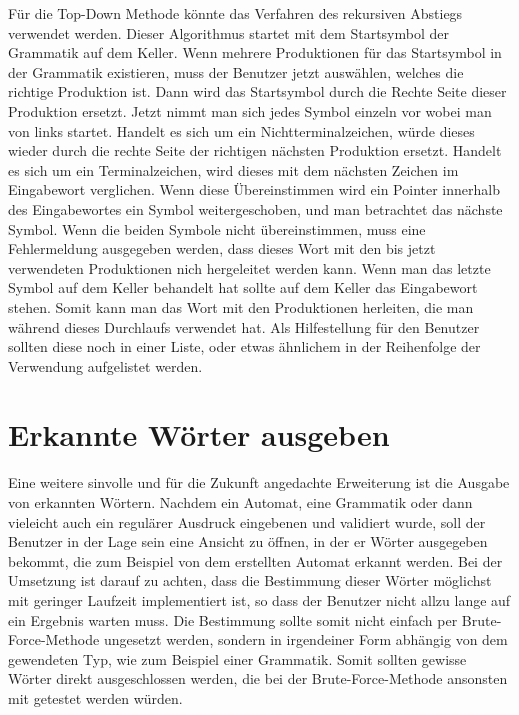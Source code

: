 Für die Top-Down Methode könnte das Verfahren des rekursiven Abstiegs verwendet
werden. Dieser Algorithmus startet mit dem Startsymbol der Grammatik auf dem
Keller. Wenn mehrere Produktionen für das Startsymbol in der Grammatik
existieren, muss der Benutzer jetzt auswählen, welches die richtige Produktion ist. Dann wird
das Startsymbol durch die Rechte Seite dieser Produktion ersetzt. Jetzt nimmt
man sich jedes Symbol einzeln vor wobei man von links startet. Handelt es sich
um ein Nichtterminalzeichen, würde dieses wieder durch die rechte Seite der
richtigen nächsten Produktion ersetzt. Handelt es sich um ein Terminalzeichen,
wird dieses mit dem nächsten Zeichen im Eingabewort verglichen. Wenn diese
Übereinstimmen wird ein Pointer innerhalb des Eingabewortes ein Symbol
weitergeschoben, und man betrachtet das nächste Symbol. Wenn die beiden Symbole
nicht übereinstimmen, muss eine Fehlermeldung ausgegeben werden, dass dieses
Wort mit den bis jetzt verwendeten Produktionen nich hergeleitet werden kann.
Wenn man das letzte Symbol auf dem Keller behandelt hat sollte auf dem Keller
das Eingabewort stehen. Somit kann man das Wort mit den Produktionen herleiten,
die man während dieses Durchlaufs verwendet hat. Als Hilfestellung für den
Benutzer sollten diese noch in einer Liste, oder etwas ähnlichem in der
Reihenfolge der Verwendung aufgelistet werden.\vspace{10pt}

\section{Erkannte Wörter ausgeben}

Eine weitere sinvolle und für die Zukunft angedachte Erweiterung ist die
Ausgabe von erkannten Wörtern. Nachdem ein Automat, eine Grammatik oder dann
vieleicht auch ein regulärer Ausdruck eingebenen und validiert wurde, soll der
Benutzer in der Lage sein eine Ansicht zu öffnen, in der er Wörter ausgegeben
bekommt, die zum Beispiel von dem erstellten Automat erkannt werden. Bei der
Umsetzung ist darauf zu achten, dass die Bestimmung dieser Wörter möglichst mit
geringer Laufzeit implementiert ist, so dass der Benutzer nicht allzu lange auf
ein Ergebnis warten muss. Die Bestimmung sollte somit nicht einfach per
Brute-Force-Methode ungesetzt werden, sondern in irgendeiner Form abhängig von
dem gewendeten Typ, wie zum Beispiel einer Grammatik. Somit sollten gewisse
Wörter direkt ausgeschlossen werden, die bei der Brute-Force-Methode ansonsten
mit getestet werden würden.



